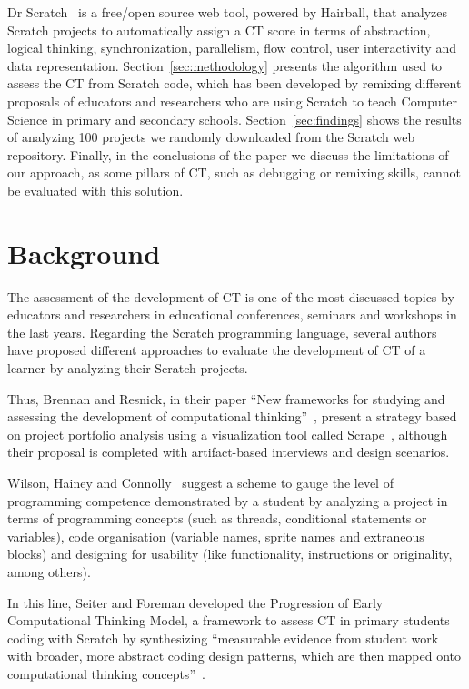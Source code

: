 \documentclass[a4paper,11pt]{article}
\begin{document}
Dr Scratch~\cite{moreno2014drscratch} is a free/open source web tool, powered by Hairball, that analyzes Scratch projects to automatically assign a CT score in terms of abstraction, logical thinking, synchronization, parallelism, flow control, user interactivity and data representation. Section~\ref{sec:methodology} presents the algorithm used to assess the CT from Scratch code, which has been developed by remixing different proposals of educators and researchers who are using Scratch to teach Computer Science in primary and secondary schools.
Section~\ref{sec:findings} shows the results of analyzing 100 projects we randomly downloaded from the Scratch web repository. Finally, in the conclusions of the paper we discuss the limitations of our approach, as some pillars of CT, such as debugging or remixing skills, cannot be evaluated with this solution.


\section{Background}
\label{sec:background}

The assessment of the development of CT is one of the most discussed topics by educators and researchers in educational conferences, seminars and workshops in the last years. Regarding the Scratch programming language, several authors have proposed different approaches to evaluate the development of CT of a learner by analyzing their Scratch projects. 

Thus, Brennan and Resnick, in their paper ``New frameworks for studying and assessing the development of computational thinking''~\cite{brennan2012new}, present a strategy based on project portfolio analysis using a visualization tool called Scrape~\cite{wolz2011scrape}, although their proposal is completed with artifact-based interviews and design scenarios.

Wilson, Hainey and Connolly~\cite{wilson2012evaluation} suggest a scheme to gauge the level of programming competence demonstrated by a student by analyzing a project in terms of programming concepts (such as threads, conditional statements or variables), code organisation (variable names, sprite names and extraneous blocks) and designing for usability (like functionality, instructions or originality, among others).

In this line, Seiter and Foreman developed the Progression of Early Computational Thinking Model, a framework to assess CT in primary students coding with Scratch by synthesizing ``measurable evidence from student work with broader, more abstract coding design patterns, which are then mapped onto computational thinking concepts''~\cite{seiter2013modeling}.
\end{document}
